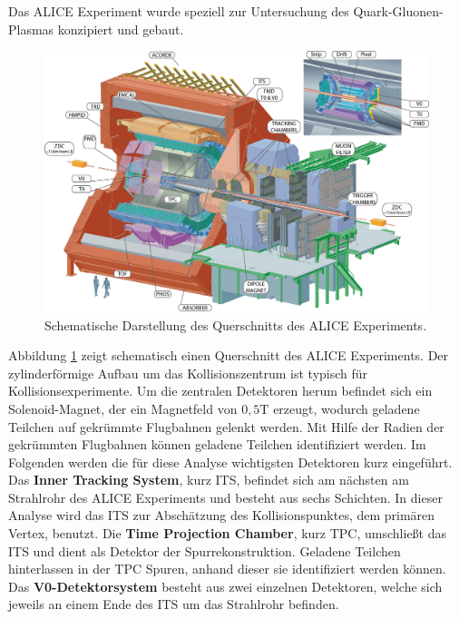 Das ALICE Experiment wurde speziell zur Untersuchung des Quark-Gluonen-Plasmas konzipiert und gebaut.
\begin{figure}[tp]
\centering
\includegraphics[width=.9\linewidth]{ALICE.jpg}
\caption{Schematische Darstellung des Querschnitts des ALICE Experiments.
\cite{WEBSITE:1}}
\label{fig:ALICE}
\end{figure}
Abbildung \ref{fig:ALICE} zeigt schematisch einen Querschnitt des ALICE Experiments. Der zylinderförmige Aufbau um das Kollisionszentrum ist typisch für Kollisionsexperimente.
\newline
Um die zentralen Detektoren herum befindet sich ein Solenoid-Magnet, der ein Magnetfeld von $0,5 \text{T}$ erzeugt, wodurch geladene Teilchen auf gekrümmte Flugbahnen gelenkt werden.
Mit Hilfe der Radien der gekrümmten Flugbahnen können geladene Teilchen identifiziert werden.
Im Folgenden werden die für diese Analyse wichtigsten Detektoren kurz eingeführt.
\newline
Das \textbf{Inner Tracking System}, kurz ITS, befindet sich am nächsten am Strahlrohr des ALICE Experiments und besteht aus sechs Schichten.
In dieser Analyse wird das ITS zur Abschätzung des Kollisionspunktes, dem primären Vertex, benutzt.
\newline
Die \textbf{Time Projection Chamber}, kurz TPC, umschließt das ITS und dient als Detektor der Spurrekonstruktion.
Geladene Teilchen hinterlassen in der TPC Spuren, anhand dieser sie identifiziert werden können.
\newline
Das \textbf{V0-Detektorsystem} besteht aus zwei einzelnen Detektoren, welche sich jeweils an einem Ende des ITS um das Strahlrohr befinden.
